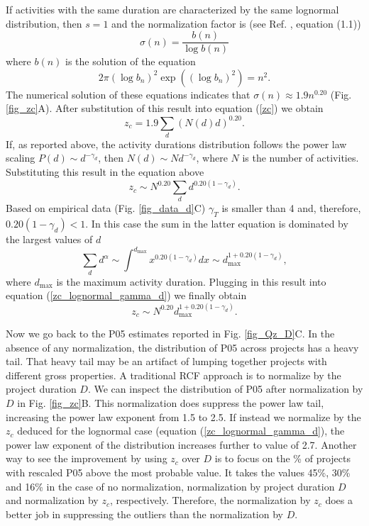 \documentclass[11pt]{article}
\begin{document}
If activities with the same duration are characterized by the same lognormal distribution, then $s=1$ and the normalization factor is (see Ref. \cite{liao12}, equation (1.1))
%
\begin{equation}
\sigma(n) = \frac{b(n)}{\log b(n)}
\label{sigma_b}
\end{equation}
%
where $b(n)$ is the solution of the equation
%
\begin{equation}
2\pi (\log b_n)^2 \exp\left( (\log b_n)^2\right) = n^2.
\label{bn}
\end{equation}
%
The numerical solution of these equations indicates that $\sigma(n)\approx 1.9 n^{0.20}$ (Fig. \ref{fig_zc}A). After substitution of this result into equation (\ref{zc}) we obtain
%
\begin{equation}
z_c = 1.9 \sum_d (N(d)d)^{0.20}.
\label{zc_lognormal}
\end{equation} 
%
If, as reported above, the activity durations distribution follows the power law scaling $P(d)\sim d^{-\gamma_d}$, then $N(d) \sim N d^{-\gamma_d}$, where $N$ is the number of activities. Substituting this result in the equation above
%
\begin{equation}
z_c \sim N^{0.20} \sum_d d^{0.20(1-\gamma_d)}.
\label{zc_lognormal_gamma_d}
\end{equation} 
%
Based on empirical data (Fig. \ref{fig_data_d}C) $\gamma_T$ is smaller than 4 and, therefore, $0.20(1-\gamma_d)<1$. In this case the sum in the latter equation is dominated by the largest values of $d$
%
\begin{equation}
\sum_d d^\alpha \sim \int^{d_{\max}} x^{0.20(1-\gamma_d)} dx \sim d_{\max}^{1+0.20(1-\gamma_d)},
\end{equation}
%
where $d_{\max}$ is the maximum activity duration. Plugging in this result into equation (\ref{zc_lognormal_gamma_d}) we finally obtain
%
\begin{equation}
z_c \sim N^{0.20} d_{\max}^{1+0.20(1-\gamma_d)}.
\label{zc_lognormal_gamma_d_dmax}
\end{equation} 

Now we go back to the P05 estimates reported in Fig. \ref{fig_Qz_D}C. In the absence of any normalization, the distribution of P05 across projects has a heavy tail. That heavy tail may be an artifact of lumping together projects with different gross properties. A traditional RCF approach is to normalize by the project duration $D$. We can inspect the distribution of P05 after normalization by $D$ in Fig.  \ref{fig_zc}B. This normalization does suppress the power law tail, increasing the power law exponent from 1.5 to 2.5. If instead we normalize by the $z_c$ deduced for the lognormal case (equation (\ref{zc_lognormal_gamma_d}), the power law exponent of the distribution increases further to value of 2.7. Another way to see the improvement by using $z_c$ over $D$ is to focus on the \% of projects with rescaled P05 above the most probable value. It takes the values 45\%, 30\% and 16\% in the case of no normalization, normalization by project duration $D$ and normalization by $z_c$, respectively. Therefore, the normalization by $z_c$ does a better job in suppressing the outliers than the normalization by $D$.
\end{document}
